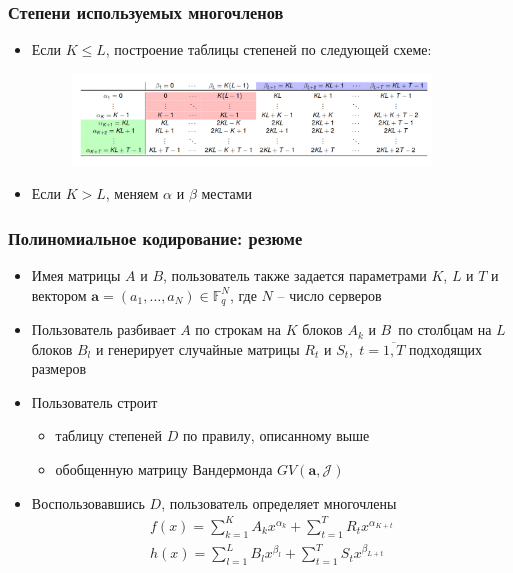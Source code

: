 \documentclass{beamer}
\let\vec\mathbf
\begin{document}
\begin{frame}
    \frametitle{Степени используемых многочленов}
    \begin{itemize}
        \item Если $K \leqslant L$, построение таблицы степеней по следующей схеме:
        \begin{figure}[]
            \centering
            \includegraphics[width=0.9\textwidth]{gasp.png}
        \end{figure}
        \item Если $K > L$, меняем $\alpha$ и $\beta$ местами
    \end{itemize}
\end{frame}

\begin{frame}
    \frametitle{Полиномиальное кодирование: резюме}
    \begin{itemize}
        \item<1-> Имея матрицы $A$ и $B$, пользователь также задается параметрами $K$, $L$ и $T$ и вектором $\vec{a} = \left(a_1, \dots, a_N\right) \in \mathbb{F}^N_q$, где $N$ -- число серверов
        \item<2-> Пользователь разбивает $A$ по строкам на $K$ блоков $A_k$ и $B$~по столбцам на $L$ блоков $B_l$ и генерирует случайные матрицы $R_t$ и $S_t,\; t=\overline{1,T}$ подходящих размеров

        \item<3-> Пользователь строит 
        \begin{itemize}
            \item таблицу степеней $D$ по правилу, описанному выше
            \item обобщенную матрицу Вандермонда $GV(\vec{a}, \mathcal{J})$
        \end{itemize}
        \item<4-> Воспользовавшись $D$, пользователь определяет многочлены 
        \begin{gather*}
            f(x) = \sum_{k=1}^K A_k x^{\alpha_k} + \sum_{t=1}^{T}R_t x^{\alpha_{K+t}} \\
            h(x) = \sum_{l=1}^L B_l x^{\beta_l} + \sum_{t=1}^{T}S_t x^{\beta_{L+t}}
        \end{gather*} 
    \end{itemize}
\end{frame}
\end{document}
